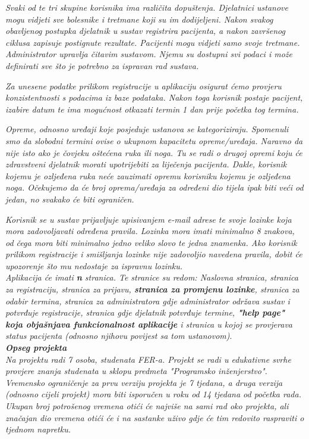 		\textit{Svaki od te tri skupine korisnika ima različita dopuštenja. Djelatnici ustanove mogu vidjeti sve bolesnike i tretmane koji su im dodijeljeni. Nakon svakog obavljenog postupka djelatnik u sustav registrira pacijenta, a nakon završenog ciklusa zapisuje postignute rezultate. Pacijenti mogu vidjeti samo svoje tretmane. Administrator upravlja čitavim sustavom. Njemu su dostupni svi podaci i može definirati sve što je potrebno za ispravan rad sustava.}
		
		\textit{Za unesene podatke prilikom registracije u aplikaciju osigurat ćemo provjeru konzistentnosti s podacima iz baze podataka. Nakon toga korisnik postaje pacijent, izabire datum te ima mogućnost otkazati termin 1 dan prije početka tog termina.}
		
		\textit{Opreme, odnosno uređaji koje posjeduje ustanova se kategoriziraju. Spomenuli smo da slobodni termini ovise o ukupnom kapacitetu opreme/uređaja. Naravno da nije isto ako je čovjeku oštećena ruka ili noga. Tu se radi o drugoj opremi koju će zdravstveni djelatnik morati upotrijebiti za liječenja pacijenta. Dakle, korisnik kojemu je ozljeđena ruka neće zauzimati opremu korisniku kojemu je ozljeđena noga. Očekujemo da će broj oprema/uređaja za određeni dio tijela ipak biti veći od jedan, no svakako će biti ograničen.}
		
		\textit{Korisnik se u sustav prijavljuje upisivanjem e-mail adrese te svoje lozinke koja mora zadovoljavati određena pravila. Lozinka mora imati minimalno 8 znakova, od čega mora biti minimalno jedno veliko slovo te jedna znamenka. Ako korisnik prilikom registracije i smišljanja lozinke nije zadovoljio navedena pravila, dobit će upozorenje što mu nedostaje za ispravnu lozinku.}\\
		
		\textit{Aplikacija će imati \textbf{n} stranica. Te stranice su redom: Naslovna stranica, stranica za registraciju, stranica za prijavu, \textbf{stranica za promjenu lozinke}, stranica za odabir termina, stranica za administratora gdje administrator održava sustav i potvrđuje registracije, stranica gdje djelatnik potvrđuje termine, \textbf{"help page" koja objašnjava funkcionalnost aplikacije} i stranica u kojoj se provjerava status pacijenta (odnosno njihovu povijest sa tom ustanovom)}.\\
		
		\textbf{\textit{Opseg projekta}}\\
		
		\textit{Na projektu radi 7 osoba, studenata FER-a. Projekt se radi u edukativne svrhe provjere znanja studenata u sklopu predmeta "Programsko inženjerstvo". Vremensko ograničenje za prvu verziju projekta je 7 tjedana, a druga verzija (odnosno cijeli projekt) mora biti isporučen u roku od 14 tjedana od početka rada. Ukupan broj potrošenog vremena otići će najviše na sami rad oko projekta, ali značajan dio vremena otići će i na sastanke uživo gdje će tim redovito raspraviti o tjednom napretku.}
		
		\eject
		